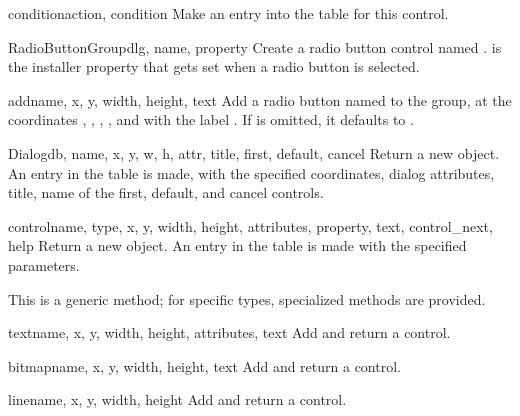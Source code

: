 \begin{methoddesc}[Control]{condition}{action, condition}
  Make an entry into the  table for this control.
\end{methoddesc}


\begin{classdesc}{RadioButtonGroup}{dlg, name, property}
  Create a radio button control named . 
  is the installer property that gets set when a radio button
  is selected.
\end{classdesc}

\begin{methoddesc}[RadioButtonGroup]{add}{name, x, y, width, height, text
                                          }
  Add a radio button named  to the group, at the
  coordinates , , , , and
  with the label . If  is omitted, it
  defaults to .
\end{methoddesc}
           
\begin{classdesc}{Dialog}{db, name, x, y, w, h, attr, title, first, 
    default, cancel}
  Return a new  object. An entry in the  table
  is made, with the specified coordinates, dialog attributes, title,
  name of the first, default, and cancel controls.
\end{classdesc}

\begin{methoddesc}[Dialog]{control}{name, type, x, y, width, height, 
                  attributes, property, text, control_next, help}
  Return a new  object. An entry in the  table
  is made with the specified parameters.

  This is a generic method; for specific types, specialized methods
  are provided.
\end{methoddesc}


\begin{methoddesc}[Dialog]{text}{name, x, y, width, height, attributes, text}
  Add and return a  control.
\end{methoddesc}

\begin{methoddesc}[Dialog]{bitmap}{name, x, y, width, height, text}
  Add and return a  control.
\end{methoddesc}

\begin{methoddesc}[Dialog]{line}{name, x, y, width, height}
  Add and return a  control.
\end{methoddesc}


